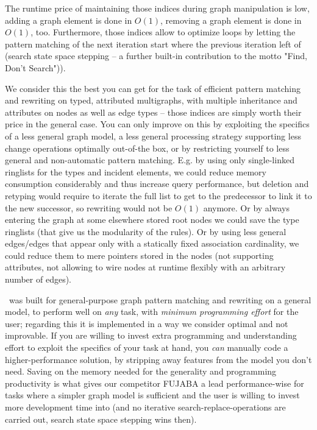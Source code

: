 The runtime price of maintaining those indices during graph manipulation is low, adding a graph element is done in $O(1)$, removing a graph element is done in $O(1)$, too. 
Furthermore, those indices allow to optimize loops by letting the pattern matching of the next iteration start where the previous iteration left of (search state space stepping -- a further built-in contribution to the motto "Find, Don't Search")).

We consider this the best you can get for the task of efficient pattern matching and rewriting on typed, attributed multigraphs, with multiple inheritance and attributes on nodes as well as edge types -- those indices are simply worth their price in the general case.
You can only improve on this by exploiting the specifics of a less general graph model, a less general processing strategy supporting less change operations optimally out-of-the box, or by restricting yourself to less general and non-automatic pattern matching.
E.g. by using only single-linked ringlists for the types and incident elements, we could reduce memory consumption considerably and thus increase query performance, but deletion and retyping would require to iterate the full list to get to the predecessor to link it to the new successor, so rewriting would not be $O(1)$ anymore.
Or by always entering the graph at some elsewhere stored root nodes we could save the type ringlists (that give us the modularity of the rules).
Or by using less general edges/edges that appear only with a statically fixed association cardinality, we could reduce them to mere pointers stored in the nodes (not supporting attributes, not allowing to wire nodes at runtime flexibly with an arbitrary number of edges).

\GrG\ was built for general-purpose graph pattern matching and rewriting on a general model, to perform well on \emph{any} task, with \emph{minimum programming effort} for the user; regarding this it is implemented in a way we consider optimal and not improvable.
If you are willing to invest extra programming and understanding effort to exploit the specifics of your task at hand, you \emph{can} manually code a higher-performance solution, by stripping away features from the model you don't need.
Saving on the memory needed for the generality and programming productivity is what gives our competitor FUJABA a lead performance-wise for tasks where a simpler graph model is sufficient and the user is willing to invest more development time into (and no iterative search-replace-operations are carried out, search state space stepping wins then).

